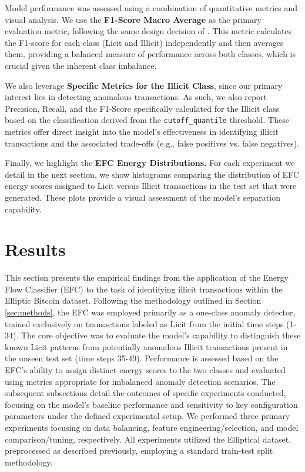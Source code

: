 \documentclass[12pt]{article}
\begin{document}
Model performance was assessed using a combination of quantitative metrics and visual analysis. We use the \textbf{F1-Score Macro Average}
as the primary evaluation metric, following the same design decision of \cite{lorenz2021machinelearningmethodsdetect}.
This metric calculates the F1-score for each class (Licit and Illicit) independently and then averages them, providing a
balanced measure of performance across both classes, which is crucial given the inherent class imbalance. 

We also leverage \textbf{Specific Metrics for the Illicit Class}, since our primary interest lies in detecting anomalous
transactions. As such, we also report Precision, Recall, and the F1-Score specifically calculated for the Illicit class
based on the classification derived from the \texttt{cutoff\_quantile} threshold. These metrics offer direct insight into
the model's effectiveness in identifying illicit transactions and the associated trade-offs (e.g., false positives vs. false negatives). 

Finally, we highlight the \textbf{EFC Energy Distributions.} For each experiment we detail in the next section, we show
histograms comparing the distribution of EFC energy scores assigned to Licit versus Illicit transactions in the test set
that were generated. These plots provide a visual assessment of the model's separation capability.

\section{Results} \label{sec:results}

This section presents the empirical findings from the application of the Energy Flow Classifier (EFC) to the task of
identifying illicit transactions within the Elliptic Bitcoin dataset. Following the methodology outlined in Section
\ref{sec:methods}, the EFC was employed primarily as a one-class anomaly detector, trained exclusively on transactions
labeled as Licit from the initial time steps (1-34). The core objective was to evaluate the model's capability to distinguish
these known Licit patterns from potentially anomalous Illicit transactions present in the unseen test set (time steps 35-49).
Performance is assessed based on the EFC's ability to assign distinct energy scores to the two classes and evaluated using
metrics appropriate for imbalanced anomaly detection scenarios. The subsequent subsections detail the outcomes of specific
experiments conducted, focusing on the model's baseline performance and sensitivity to key configuration parameters under
the defined experimental setup. We performed three primary
experiments focusing on data balancing, feature engineering/selection, and model comparison/tuning, respectively. All experiments
utilized the Elliptical dataset, preprocessed as described previously, employing a standard train-test split methodology.
\end{document}
